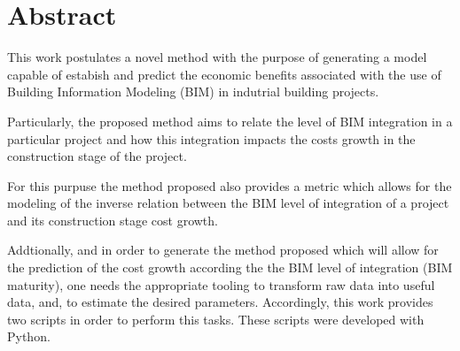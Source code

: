 \chapter*{Abstract}

This work postulates a novel method with the purpose of generating a model capable of estabish and predict the economic benefits associated with the use of Building Information Modeling (BIM) in indutrial building projects.

Particularly, the proposed method aims to relate the level of BIM integration in a particular project and how this integration impacts the costs growth in the construction stage of the project.

For this purpuse the method proposed also provides a metric which allows for the modeling of the inverse relation between the BIM level of integration of a project and its construction stage cost growth.

Addtionally, and in order to generate the method proposed which will allow for the prediction of the cost growth according the the BIM level of integration (BIM maturity), one needs the appropriate tooling to transform raw data into useful data, and, to estimate the desired parameters. Accordingly, this work provides two scripts in order to perform this tasks. These scripts were developed with Python.